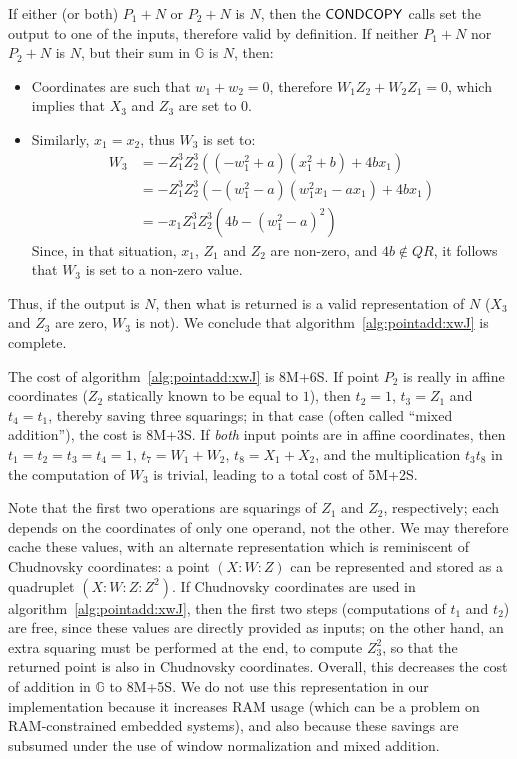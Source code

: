 \documentclass{llncs}
\newcommand{\QR}{QR}
\newcommand{\bG}{\mathbb{G}}
\begin{document}
If either (or both) $P_1+N$ or $P_2+N$ is $N$, then the
$\text{\textsf{CONDCOPY}}$ calls set the output to one of the inputs,
therefore valid by definition. If neither $P_1+N$ nor $P_2+N$ is $N$,
but their sum in $\bG$ is $N$, then:
\begin{itemize}

    \item Coordinates are such that $w_1 + w_2 = 0$, therefore $W_1 Z_2
    + W_2 Z_1 = 0$, which implies that $X_3$ and $Z_3$ are set to $0$.

    \item Similarly, $x_1 = x_2$, thus $W_3$ is set to:
    \begin{align*}
        W_3 &= -Z_1^3 Z_2^3 ((-w_1^2 + a)(x_1^2 + b) + 4b x_1) \\
            &= -Z_1^3 Z_2^3 (-(w_1^2 - a)(w_1^2 x_1 - a x_1) + 4b x_1) \\
            &= -x_1 Z_1^3 Z_2^3 (4b - (w_1^2 - a)^2)
    \end{align*}
    Since, in that situation, $x_1$, $Z_1$ and $Z_2$ are non-zero, and
    $4b \notin \QR$, it follows that $W_3$ is set to a non-zero value.

\end{itemize}
Thus, if the output is $N$, then what is returned is a valid
representation of $N$ ($X_3$ and $Z_3$ are zero, $W_3$ is not). We
conclude that algorithm~\ref{alg:pointadd:xwJ} is complete.

The cost of algorithm~\ref{alg:pointadd:xwJ} is 8M+6S. If point $P_2$ is
really in affine coordinates ($Z_2$ statically known to be equal to
$1$), then $t_2 = 1$, $t_3 = Z_1$ and $t_4 = t_1$, thereby saving three
squarings; in that case (often called ``mixed addition''), the cost is
8M+3S. If \emph{both} input points are in affine coordinates, then $t_1
= t_2 = t_3 = t_4 = 1$, $t_7 = W_1 + W_2$, $t_8 = X_1 + X_2$, and the
multiplication $t_3 t_8$ in the computation of $W_3$ is trivial, leading
to a total cost of 5M+2S.

Note that the first two operations are squarings of $Z_1$ and $Z_2$,
respectively; each depends on the coordinates of only one operand, not
the other. We may therefore cache these values, with an alternate
representation which is reminiscent of Chudnovsky
coordinates\cite{ChuChu1986}: a point $(X{:}W{:}Z)$ can be represented
and stored as a quadruplet $(X{:}W{:}Z{:}Z^2)$. If Chudnovsky
coordinates are used in algorithm~\ref{alg:pointadd:xwJ}, then the first
two steps (computations of $t_1$ and $t_2$) are free, since these values
are directly provided as inputs; on the other hand, an extra squaring
must be performed at the end, to compute $Z_3^2$, so that the returned
point is also in Chudnovsky coordinates. Overall, this decreases the
cost of addition in $\bG$ to 8M+5S. We do not use this representation in
our implementation because it increases RAM usage (which can be a
problem on RAM-constrained embedded systems), and also because these
savings are subsumed under the use of window normalization and mixed
addition.
\end{document}
